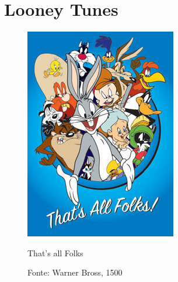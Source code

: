 \begin{anexosenv}
\label{attachments}

\chapter{Looney Tunes} \label{anexoA}

\begin{figure}[htb] 
    \centering
    \includegraphics[]{figures/looneytunes.jpg}
    \caption{That's all Folks}
    \label{fig_looneytunes}
    \caption*{Fonte: Warner Bross, 1500}
\end{figure}



\end{anexosenv}